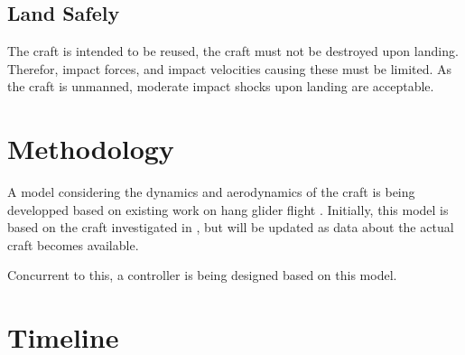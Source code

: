 \documentclass{sydeStyle}
\begin{document}
\section{Land Safely}

The craft is intended to be reused, the craft must not be destroyed
upon landing. Therefor, impact forces, and impact velocities causing these must
be limited. As the craft is unmanned, moderate impact shocks upon landing are
acceptable.


\chapter{Methodology}

A model considering the dynamics and aerodynamics of the craft is being
developped based on existing work on hang glider flight \cite{spottiswoode}.
Initially, this model is based on the craft investigated in \cite{spottiswoode},
but will be updated as data about the actual craft becomes available.

Concurrent to this, a controller is being designed based on this model.


\chapter{Timeline}


\end{document}
